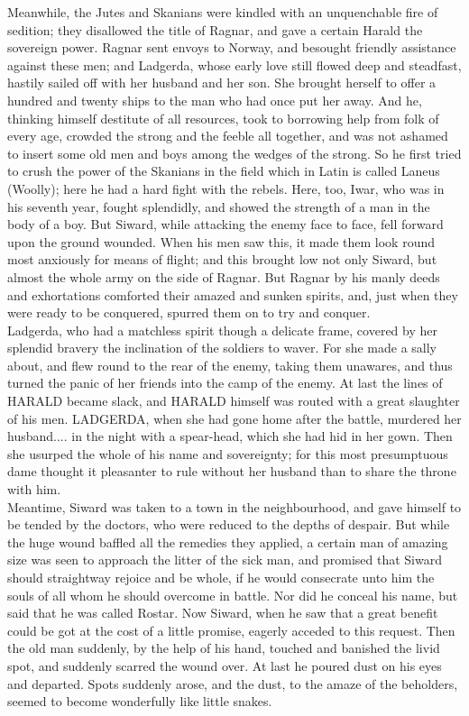 \documentclass[10pt,a4paper]{report}
\begin{document}
Meanwhile, the Jutes and Skanians were kindled with an unquenchable fire of sedition; they disallowed the title of Ragnar, and gave a certain Harald the sovereign power. Ragnar sent envoys to Norway, and besought friendly assistance against these men; and Ladgerda, whose early love still flowed deep and steadfast, hastily sailed off with her husband and her son. She brought herself to offer a hundred and twenty ships to the man who had once put her away. And he, thinking himself destitute of all resources, took to borrowing help from folk of every age, crowded the strong and the feeble all together, and was not ashamed to insert some old men and boys among the wedges of the strong. So he first tried to crush the power of the Skanians in the field which in Latin is called Laneus (Woolly); here he had a hard fight with the rebels. Here, too, Iwar, who was in his seventh year, fought splendidly, and showed the strength of a man in the body of a boy. But Siward, while attacking the enemy face to face, fell forward upon the ground wounded. When his men saw this, it made them look round most anxiously for means of flight; and this brought low not only Siward, but almost the whole army on the side of Ragnar. But Ragnar by his manly deeds and exhortations comforted their amazed and sunken spirits, and, just when they were ready to be conquered, spurred them on to try and conquer.\\

Ladgerda, who had a matchless spirit though a delicate frame, covered by her splendid bravery the inclination of the soldiers to waver. For she made a sally about, and flew round to the rear of the enemy, taking them unawares, and thus turned the panic of her friends into the camp of the enemy. At last the lines of HARALD became slack, and HARALD himself was routed with a great slaughter of his men. LADGERDA, when she had gone home after the battle, murdered her husband.... in the night with a spear-head, which she had hid in her gown. Then she usurped the whole of his name and sovereignty; for this most presumptuous dame thought it pleasanter to rule without her husband than to share the throne with him.\\

Meantime, Siward was taken to a town in the neighbourhood, and gave himself to be tended by the doctors, who were reduced to the depths of despair. But while the huge wound baffled all the remedies they applied, a certain man of amazing size was seen to approach the litter of the sick man, and promised that Siward should straightway rejoice and be whole, if he would consecrate unto him the souls of all whom he should overcome in battle. Nor did he conceal his name, but said that he was called Rostar. Now Siward, when he saw that a great benefit could be got at the cost of a little promise, eagerly acceded to this request. Then the old man suddenly, by the help of his hand, touched and banished the livid spot, and suddenly scarred the wound over. At last he poured dust on his eyes and departed. Spots suddenly arose, and the dust, to the amaze of the beholders, seemed to become wonderfully like little snakes.\\
\end{document}
